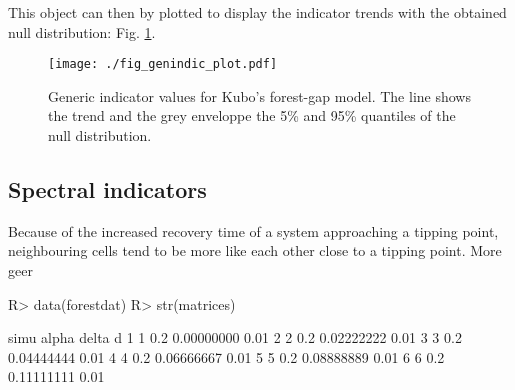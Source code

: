 \documentclass{article}
\begin{document}
This object can then by plotted to display the indicator trends with the 
obtained null distribution: Fig. \ref{genindic_plot}. 
  
\begin{figure}
  \texttt{[image: ./fig\_genindic\_plot.pdf]}
  \caption{Generic indicator values for Kubo's forest-gap model. The line shows 
           the trend and the grey enveloppe the 5\% and 95\% quantiles of the 
           null distribution.}
  \label{genindic_plot}
\end{figure}

  \subsection{Spectral indicators}
  \label{spectral_ic}
  
  Because of the increased recovery time of a system approaching a tipping 
  point, neighbouring cells tend to be more like each other close to a tipping
  point. More geer
  
  
\begin{Schunk}
\begin{Sinput}
R>   data(forestdat)
R>   str(matrices)
\end{Sinput}
\end{Schunk}

\begin{Schunk}
\end{Schunk}

\begin{Schunk}
\begin{Soutput}
  simu alpha      delta    d
1    1   0.2 0.00000000 0.01
2    2   0.2 0.02222222 0.01
3    3   0.2 0.04444444 0.01
4    4   0.2 0.06666667 0.01
5    5   0.2 0.08888889 0.01
6    6   0.2 0.11111111 0.01
\end{Soutput}
\end{Schunk}
\end{document}
